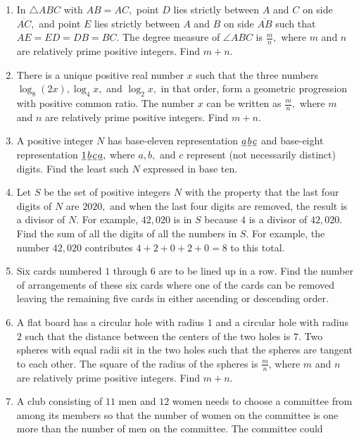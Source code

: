 \documentclass{article}
\begin{document}
\begin{enumerate}[label=\arabic*., itemsep=0.5em]
\item In \(\triangle ABC\) with \(AB=AC,\) point \(D\) lies strictly between \(A\) and \(C\) on side \(\overline{AC},\) and point \(E\) lies strictly between \(A\) and \(B\) on side \(\overline{AB}\) such that \(AE=ED=DB=BC.\) The degree measure of \(\angle ABC\) is \(\tfrac{m}{n},\) where \(m\) and \(n\) are relatively prime positive integers. Find \(m+n.\)\par \vspace{0.5em}\item There is a unique positive real number \(x\) such that the three numbers \(\log_8(2x),\log_4x,\) and \(\log_2x,\) in that order, form a geometric progression with positive common ratio. The number \(x\) can be written as \(\tfrac{m}{n},\) where \(m\) and \(n\) are relatively prime positive integers. Find \(m+n.\)\par \vspace{0.5em}\item A positive integer \(N\) has base-eleven representation \(\underline{a}\kern 0.1em\underline{b}\kern 0.1em\underline{c}\) and base-eight representation \(\underline1\kern 0.1em\underline{b}\kern 0.1em\underline{c}\kern 0.1em\underline{a},\) where \(a,b,\) and \(c\) represent (not necessarily distinct) digits. Find the least such \(N\) expressed in base ten.\par \vspace{0.5em}\item Let \(S\) be the set of positive integers \(N\) with the property that the last four digits of \(N\) are \(2020,\) and when the last four digits are removed, the result is a divisor of \(N.\) For example, \(42{,}020\) is in \(S\) because \(4\) is a divisor of \(42{,}020.\) Find the sum of all the digits of all the numbers in \(S.\) For example, the number \(42{,}020\) contributes \(4+2+0+2+0=8\) to this total.\par \vspace{0.5em}\item Six cards numbered \(1\) through \(6\) are to be lined up in a row. Find the number of arrangements of these six cards where one of the cards can be removed leaving the remaining five cards in either ascending or descending order.\par \vspace{0.5em}\item A flat board has a circular hole with radius \(1\) and a circular hole with radius \(2\) such that the distance between the centers of the two holes is \(7\). Two spheres with equal radii sit in the two holes such that the spheres are tangent to each other. The square of the radius of the spheres is \(\tfrac{m}{n}\), where \(m\) and \(n\) are relatively prime positive integers. Find \(m+n\).\par \vspace{0.5em}\item A club consisting of \(11\) men and \(12\) women needs to choose a committee from among its members so that the number of women on the committee is one more than the number of men on the committee. The committee could 
\end{enumerate}
\end{document}
